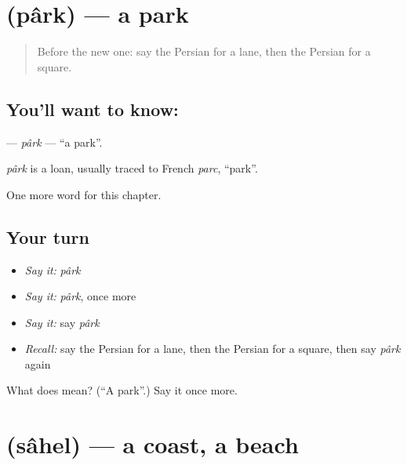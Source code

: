 \section[\texorpdfstring{\fa{پارک} (pârk)}{پارک (pârk)}]{ (pârk) — a park}

\label{lesson:FA-C87-park}



\begin{quote}
Before the new one: say the Persian for a lane, then the Persian for a square.
\end{quote}

\subsection*{You'll want to know: }
\textbf{} — \emph{pârk} — \textquotedblleft{}a park\textquotedblright{}.

\begin{cousinweb}
\emph{pârk} is a loan, usually traced to French \emph{parc}, \textquotedblleft{}park\textquotedblright{}.
\end{cousinweb}

\begin{grammarlens}[title={What you've built}]
One more word for this chapter.
\end{grammarlens}

\subsection*{Your turn}
\begin{itemize}
\raggedright
  \item \emph{Say it:} \emph{pârk}
  \item \emph{Say it:} \emph{pârk}, once more
  \item \emph{Say it:} say \emph{pârk}
  \item \emph{Recall:} say the Persian for a lane, then the Persian for a square, then say \emph{pârk} again
\end{itemize}

\begin{tcolorbox}[breakable,colback=teal!4,colframe=teal!35!black,title={Before you move on}]
What does  mean? (\textquotedblleft{}A park\textquotedblright{}.) Say it once more.
\end{tcolorbox}
\section[\texorpdfstring{\fa{ساحل} (sâhel)}{ساحل (sâhel)}]{ (sâhel) — a coast, a beach}

